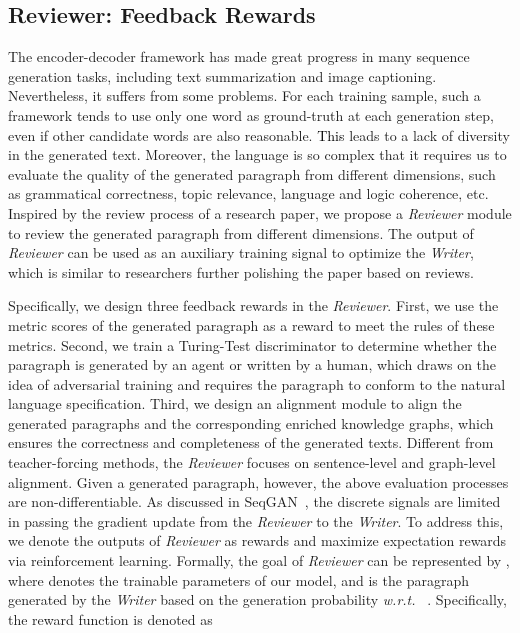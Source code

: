 \documentclass[letterpaper]{article}
\def\hmg{\textcolor{black}}
\def\wrt{\emph{w.r.t. }}
\begin{document}
\subsection{Reviewer: Feedback Rewards}

The encoder-decoder framework
has made great progress in many sequence generation tasks, including text summarization and image captioning. Nevertheless, it suffers from some problems. 
For each training sample, such a framework tends to use only one word as ground-truth at each generation step, even if other candidate words are also reasonable. \hmg{This} leads to a lack of diversity in the generated text.
Moreover, the language is so complex that it requires us to evaluate the quality of the generated paragraph from different dimensions, such as grammatical correctness, topic relevance, language and logic coherence, etc. Inspired by the review process of a research paper, we propose a \textit{Reviewer} module to review the generated paragraph from different dimensions. The output of \textit{Reviewer} can be used as an auxiliary training signal to optimize the \textit{Writer}, which is similar to researchers further polishing the paper based on reviews.

Specifically, we design three feedback rewards in the \textit{Reviewer}. 
{First, we use the metric scores of the generated paragraph as a reward to meet the rules of these metrics. }
Second, we train a Turing-Test discriminator to determine whether the paragraph is generated by an agent or written by a human, which draws on the idea of adversarial training and requires the paragraph to conform to the natural language specification. 
Third, we design an alignment module to align the generated paragraphs and the corresponding enriched knowledge graphs, which ensures the correctness and completeness of the generated texts.
Different from teacher-forcing methods, the \textit{Reviewer} focuses on sentence-level and graph-level alignment.
Given a generated paragraph, however, the above evaluation processes are non-differentiable. As discussed in SeqGAN~\cite{Yu2017SeqGANSG}, the discrete signals 
are limited in passing the gradient update from the \textit{Reviewer} to the \textit{Writer}. To address this, we denote the outputs of \textit{Reviewer} as rewards  and maximize expectation rewards  via reinforcement learning. Formally, the goal of \textit{Reviewer} can be represented by
    ,
where  denotes the trainable parameters of our model, and  is the paragraph generated by the \textit{Writer} based on the generation probability  \wrt~. Specifically, the reward function is denoted as
\end{document}

